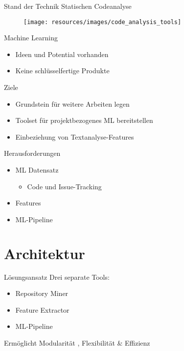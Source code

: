 \documentclass[12pt]{beamer}
\begin{document}
\begin{frame}[fragile]{Stand der Technik}
	Statischen Codeanalyse
	
	\begin{figure}[h!]
	\centering
	\texttt{[image: resources/images/code\_analysis\_tools]}
	\label{fig:staticcodeanalysis}
	\end{figure}

	
	Machine Learning
	\begin{itemize}
		\item Ideen und Potential vorhanden
		\item Keine schlüsselfertige Produkte
	\end{itemize}
	
\end{frame}

\begin{frame}[fragile]{Ziele}
	\begin{itemize}
		\item \alert{Grundstein} für weitere Arbeiten legen
		\item Toolset für \alert{projektbezogenes ML} bereitstellen
		\item Einbeziehung von \alert{Textanalyse-Features}
	\end{itemize}
\end{frame}

\begin{frame}[fragile]{Herausforderungen}
	\begin{itemize}
		\item ML Datensatz
		\begin{itemize}
			\item Code und Issue-Tracking
		\end{itemize}
		\item Features
		\item ML-Pipeline
	\end{itemize}
\end{frame}

\section{Architektur}	%

\begin{frame}[fragile]{Lösungsansatz}
	Drei separate Tools:
	\begin{itemize}
		\item \alert{Repository Miner}
		\item \alert{Feature Extractor}
		\item \alert{ML-Pipeline}
	\end{itemize}
	
	Ermöglicht Modularität , Flexibilität \& Effizienz
\end{frame}
\end{document}
